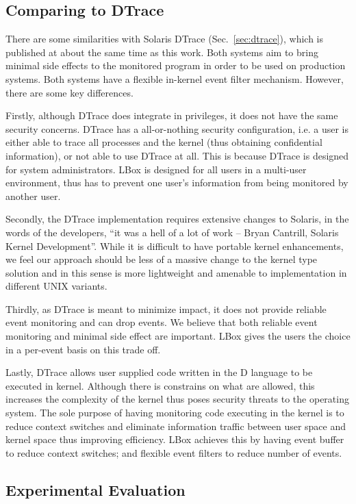 \subsection{Comparing to DTrace}
\label{sec:lbox-dtrace}

There are some similarities with Solaris DTrace (Sec.~\ref{sec:dtrace}),
which is published at about the same time as this work.
Both systems aim to bring minimal side effects to the monitored program
in order to be used on production systems.
Both systems have a flexible in-kernel event filter mechanism.
However, there are some key differences.

Firstly, although DTrace does integrate in privileges,
it does not have the same security concerns.
DTrace has a all-or-nothing security configuration, i.e.
a user is either able to trace all processes and the kernel
(thus obtaining confidential information), or not able to use DTrace at all.
This is because DTrace is designed for system administrators.
LBox is designed for all users in a multi-user environment,
thus has to prevent one user's information from being monitored
by another user.

Secondly, the DTrace implementation requires extensive changes to Solaris,
in the words of the developers,
``it was a hell of a lot of work -- Bryan Cantrill, Solaris
Kernel Development''.
While it is difficult to have portable kernel enhancements, we feel our
approach should be less of a massive change to the kernel type solution and in
this sense is more lightweight and amenable to implementation
in different UNIX variants.

Thirdly, as DTrace is meant to minimize impact, it does not provide
reliable event monitoring and can drop events.
We believe that both reliable event monitoring and minimal side effect
are important.
LBox gives the users the choice in a per-event basis on this trade off.

Lastly, DTrace allows user supplied code written in the D language
to be executed in kernel.
Although there is constrains on what are allowed,
this increases the complexity of the kernel thus
poses security threats to the operating system.
The sole purpose of having monitoring code executing in the kernel is
to reduce context switches and eliminate information traffic between user
space and kernel space thus improving efficiency.
LBox achieves this by having event buffer to reduce context switches;
and flexible event filters to reduce number of events.

\subsection{Experimental Evaluation}
\label{sec:lbox-bench}

